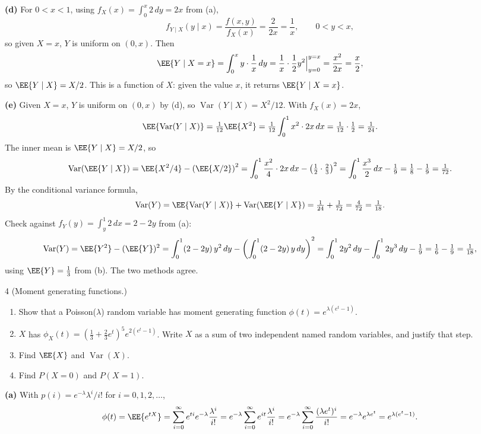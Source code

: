 \documentclass[11pt]{article}
\begin{document}
\textbf{(d)} For $0 < x < 1$, using $f_X(x) = \int_0^x 2\,dy = 2x$ from (a),
\[
  f_{Y\mid X}(y \mid x) = \frac{f(x,y)}{f_X(x)} = \frac{2}{2x} = \frac{1}{x},
    \qquad 0 < y < x,
\]
so given $X = x$, $Y$ is uniform on $(0, x)$. Then
\[
  \EE{Y \mid X = x} = \int_0^x y \cdot \frac{1}{x}\,dy
    = \frac{1}{x} \cdot \frac12 y^2 \Big|_{y=0}^{y=x} = \frac{x^2}{2x} = \frac{x}{2},
\]
so $\EE{Y \mid X} = X/2$. This is a function of $X$: given the value $x$, it returns
$\EE{Y \mid X = x}$.

\textbf{(e)} Given $X = x$, $Y$ is uniform on $(0, x)$ by (d), so
$\operatorname{Var}(Y \mid X) = X^2/12$. With $f_X(x) = 2x$,
\[
  \EE{\operatorname{Var}(Y \mid X)} = \tfrac{1}{12}\EE{X^2}
    = \tfrac{1}{12}\int_0^1 x^2 \cdot 2x\,dx = \tfrac{1}{12} \cdot \tfrac12 = \tfrac{1}{24}.
\]
The inner mean is $\EE{Y \mid X} = X/2$, so
\[
  \operatorname{Var}(\EE{Y \mid X}) = \EE{X^2/4} - \left(\EE{X/2}\right)^2
    = \int_0^1 \frac{x^2}{4} \cdot 2x\,dx - \left(\tfrac12 \cdot \tfrac23\right)^2
    = \int_0^1 \frac{x^3}{2}\,dx - \tfrac19 = \tfrac18 - \tfrac19 = \tfrac{1}{72}.
\]
By the conditional variance formula,
\[
  \operatorname{Var}(Y) = \EE{\operatorname{Var}(Y \mid X)} + \operatorname{Var}(\EE{Y \mid X})
    = \tfrac{1}{24} + \tfrac{1}{72} = \tfrac{4}{72} = \tfrac{1}{18}.
\]
Check against $f_Y(y) = \int_y^1 2\,dx = 2 - 2y$ from (a):
\[
  \operatorname{Var}(Y) = \EE{Y^2} - (\EE{Y})^2
    = \int_0^1 (2 - 2y)\,y^2\,dy - \left(\int_0^1 (2 - 2y)\,y\,dy\right)^2
    = \int_0^1 2y^2\,dy - \int_0^1 2y^3\,dy - \tfrac19
    = \tfrac16 - \tfrac19 = \tfrac{1}{18},
\]
using $\EE{Y} = \tfrac13$ from (b). The two methods agree.

\begin{problem}{4}
  (Moment generating functions.)
  \begin{enumerate}
    \item[(a)] Show that a Poisson($\lambda$) random variable has moment generating
      function $\phi(t) = e^{\lambda(e^t - 1)}$.
    \item[(b)] $X$ has $\phi_X(t) = \left(\tfrac13 + \tfrac23 e^t\right)^5 e^{2(e^t - 1)}$.
      Write $X$ as a sum of two independent named random variables, and justify that step.
    \item[(c)] Find $\EE{X}$ and $\operatorname{Var}(X)$.
    \item[(d)] Find $P(X = 0)$ and $P(X = 1)$.
  \end{enumerate}
\end{problem}
\textbf{(a)} With $p(i) = e^{-\lambda}\lambda^i / i!$ for $i = 0, 1, 2, \ldots$,
\[
  \phi(t) = \EE{e^{tX}} = \sum_{i=0}^{\infty} e^{ti} e^{-\lambda} \frac{\lambda^i}{i!}
    = e^{-\lambda} \sum_{i=0}^{\infty} e^{it} \frac{\lambda^i}{i!}
    = e^{-\lambda} \sum_{i=0}^{\infty} \frac{(\lambda e^t)^i}{i!}
    = e^{-\lambda} e^{\lambda e^t} = e^{\lambda(e^t - 1)}.
\]
\end{document}
